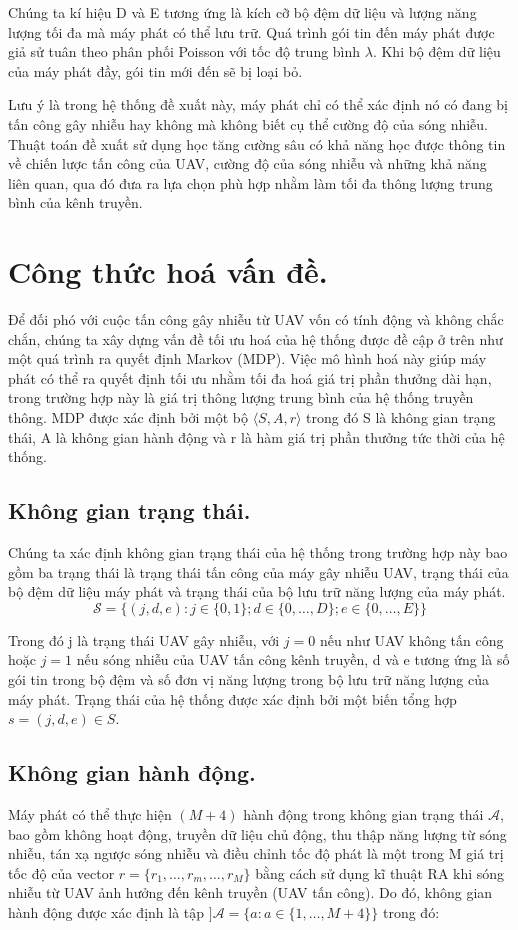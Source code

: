 \documentclass{uetgraduation}
\begin{document}
Chúng ta kí hiệu D và E tương ứng là kích cỡ bộ đệm dữ liệu và lượng năng lượng tối đa mà máy phát có thể lưu trữ. Quá trình gói tin đến máy phát được giả sử tuân theo phân
phối Poisson với tốc độ trung bình $\lambda$. Khi bộ đệm dữ liệu của máy phát đầy, gói tin mới đến sẽ bị loại bỏ.

Lưu ý là trong hệ thống đề xuất này, máy phát chỉ có thể xác định nó có đang bị tấn công gây nhiễu hay không mà không biết cụ thể cường độ của sóng nhiễu. Thuật toán đề xuất sử dụng học tăng 
cường sâu có khả năng học được thông tin về chiến lược tấn công của UAV, cường độ của sóng nhiễu và những khả năng liên quan, qua đó đưa ra lựa chọn
phù hợp nhằm làm tối đa thông lượng trung bình của kênh truyền.


\section{Công thức hoá vấn đề.}
Để đối phó với cuộc tấn công gây nhiễu từ UAV vốn có tính động và không chắc chắn, chúng ta xây dựng vấn đề tối ưu hoá của hệ thống được đề cập ở trên như một quá trình ra quyết định
Markov (MDP). Việc mô hình hoá này giúp máy phát có thể ra quyết định tối ưu nhằm tối đa hoá giá trị phần thưởng dài hạn, trong trường hợp này là giá trị thông lượng trung bình
của hệ thống truyền thông. MDP được xác định bởi một bộ $\langle S, A, r \rangle$ trong đó S là không gian trạng thái, A là không gian hành động và r là hàm giá trị phần thưởng
tức thời của hệ thống.

\subsection{Không gian trạng thái.}
Chúng ta xác định không gian trạng thái của hệ thống trong trường hợp này bao gồm ba trạng thái là trạng thái tấn công của máy gây nhiễu UAV, trạng thái của bộ đệm dữ liệu máy phát và trạng thái của bộ lưu
trữ năng lượng của máy phát.
\[
\mathcal{S} = \{(j, d, e) : j \in \{0, 1\}; d \in \{0, \dots, D\}; e \in \{0, \dots, E\}\}
\]

Trong đó j là trạng thái UAV gây nhiễu, với $j = 0$ nếu như UAV không tấn công hoặc $j = 1$ nếu sóng nhiễu của UAV tấn công kênh truyền, d và e tương ứng là số gói tin trong bộ
đệm và số đơn vị năng lượng trong bộ lưu trữ năng lượng của máy phát. Trạng thái của hệ thống được xác định bởi một biến tổng hợp $s = (j, d, e) \in S$.

\subsection{Không gian hành động.}
Máy phát có thể thực hiện $(M+4)$ hành động trong không gian trạng thái $\mathcal{A}$, bao gồm không hoạt động, truyền dữ liệu chủ động, thu thập năng lượng từ sóng nhiễu, tán xạ ngược sóng
nhiễu và điều chỉnh tốc độ phát là một trong M giá trị tốc độ của vector $r = \{r_1, \dots, r_m,\dots, r_M\}$ bằng cách sử dụng kĩ thuật RA khi sóng nhiễu từ UAV ảnh hưởng đến
kênh truyền (UAV tấn công). Do đó, không gian hành động được xác định là tập $]\mathcal{A} = \{a : a \in \{1, \dots, M+4\}\}$ trong đó:
\end{document}
